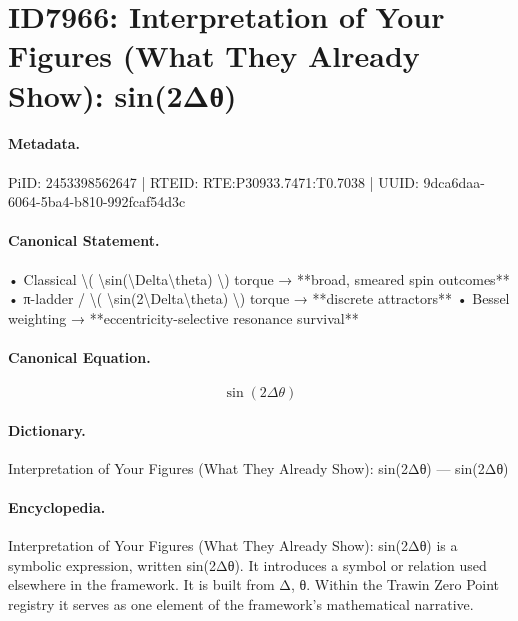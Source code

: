 \section*{ID7966: Interpretation of Your Figures (What They Already Show): sin(2Δθ)}
\paragraph{Metadata.}
PiID: 2453398562647 | RTEID: RTE:P30933.7471:T0.7038 | UUID: 9dca6daa-6064-5ba4-b810-992fcaf54d3c

\paragraph{Canonical Statement.}
• Classical \textbackslash{}( \textbackslash{}sin(\textbackslash{}Delta\textbackslash{}theta) \textbackslash{}) torque → **broad, smeared spin outcomes** • π-ladder / \textbackslash{}( \textbackslash{}sin(2\textbackslash{}Delta\textbackslash{}theta) \textbackslash{}) torque → **discrete attractors** • Bessel weighting → **eccentricity-selective resonance survival**

\paragraph{Canonical Equation.}
\[
\sin(2\Delta\theta)
\]

\paragraph{Dictionary.}
Interpretation of Your Figures (What They Already Show): sin(2Δθ) — sin(2Δθ)

\paragraph{Encyclopedia.}
Interpretation of Your Figures (What They Already Show): sin(2Δθ) is a symbolic expression, written sin(2Δθ). It introduces a symbol or relation used elsewhere in the framework. It is built from Δ, θ. Within the Trawin Zero Point registry it serves as one element of the framework's mathematical narrative.
